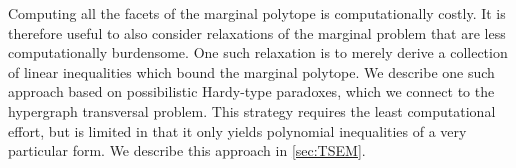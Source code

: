 Computing all the facets of the marginal polytope is computationally costly.  It is therefore useful to also consider relaxations of the marginal problem that are less computationally burdensome.  One such relaxation is to merely derive a collection
of linear inequalities which bound the marginal polytope. We describe one such approach based on possibilistic Hardy-type paradoxes, which we connect to the hypergraph transversal problem. This strategy requires the least computational effort, but is limited in that it only yields polynomial inequalities of a very particular form.  We describe this approach in \cref{sec:TSEM}.

